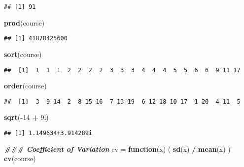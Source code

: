 \documentclass[
]{article}
\newenvironment{Shaded}{\begin{snugshade}}{\end{snugshade}}
\newcommand{\ControlFlowTok}[1]{\textcolor[rgb]{0.13,0.29,0.53}{\textbf{#1}}}
\newcommand{\DataTypeTok}[1]{\textcolor[rgb]{0.13,0.29,0.53}{#1}}
\newcommand{\DecValTok}[1]{\textcolor[rgb]{0.00,0.00,0.81}{#1}}
\newcommand{\DocumentationTok}[1]{\textcolor[rgb]{0.56,0.35,0.01}{\textbf{\textit{#1}}}}
\newcommand{\FunctionTok}[1]{\textcolor[rgb]{0.13,0.29,0.53}{\textbf{#1}}}
\newcommand{\NormalTok}[1]{#1}
\newcommand{\OtherTok}[1]{\textcolor[rgb]{0.56,0.35,0.01}{#1}}
\newcommand{\SpecialCharTok}[1]{\textcolor[rgb]{0.81,0.36,0.00}{\textbf{#1}}}
\begin{document}
\begin{verbatim}
## [1] 91
\end{verbatim}

\begin{Shaded}
\begin{Highlighting}[]
\FunctionTok{prod}\NormalTok{(course)}
\end{Highlighting}
\end{Shaded}

\begin{verbatim}
## [1] 41878425600
\end{verbatim}

\begin{Shaded}
\begin{Highlighting}[]
\FunctionTok{sort}\NormalTok{(course)}
\end{Highlighting}
\end{Shaded}

\begin{verbatim}
##  [1]  1  1  1  2  2  2  2  3  3  3  4  4  4  5  5  6  6  9 11 17
\end{verbatim}

\begin{Shaded}
\begin{Highlighting}[]
\FunctionTok{order}\NormalTok{(course)}
\end{Highlighting}
\end{Shaded}

\begin{verbatim}
##  [1]  3  9 14  2  8 15 16  7 13 19  6 12 18 10 17  1 20  4 11  5
\end{verbatim}

\begin{Shaded}
\begin{Highlighting}[]
\FunctionTok{sqrt}\NormalTok{(}\SpecialCharTok{{-}}\DecValTok{14} \SpecialCharTok{+} \DecValTok{9}\DataTypeTok{i}\NormalTok{)}
\end{Highlighting}
\end{Shaded}

\begin{verbatim}
## [1] 1.149634+3.914289i
\end{verbatim}

\begin{Shaded}
\begin{Highlighting}[]
\DocumentationTok{\#\#\# Coefficient of Variation}
\NormalTok{cv }\OtherTok{=} \ControlFlowTok{function}\NormalTok{(x) ( }\FunctionTok{sd}\NormalTok{(x) }\SpecialCharTok{/} \FunctionTok{mean}\NormalTok{(x) )}
\FunctionTok{cv}\NormalTok{(course)}
\end{Highlighting}
\end{Shaded}
\end{document}
